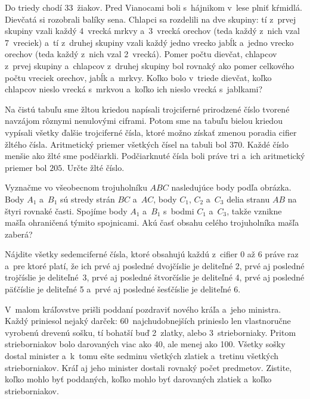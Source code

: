 {%
Do triedy chodí 33~žiakov. Pred Vianocami boli s~hájnikom v~lese plniť kŕmidlá. Dievčatá si rozobrali balíky sena. Chlapci sa rozdelili na dve skupiny: tí z~prvej skupiny vzali každý 4~vrecká mrkvy a~3~vrecká orechov (teda každý z~nich vzal 7~vreciek) a~tí z~druhej skupiny vzali každý jedno vrecko jabĺk a~jedno vrecko orechov (teda každý z~nich vzal 2~vrecká). Pomer počtu dievčat, chlapcov z~prvej skupiny a~chlapcov z~druhej skupiny bol rovnaký ako pomer celkového počtu vreciek orechov, jabĺk a~mrkvy. Koľko bolo v~triede dievčat, koľko chlapcov nieslo vrecká s~mrkvou a~koľko ich nieslo vrecká s~jablkami?}

{%
Na čistú tabuľu sme žltou kriedou napísali trojciferné prirodzené číslo tvorené navzájom rôznymi nenulovými ciframi. Potom sme na tabuľu bielou kriedou vypísali všetky ďalšie trojciferné čísla, ktoré možno získať zmenou poradia cifier žltého čísla. Aritmetický priemer všetkých čísel na tabuli bol $370$. Každé číslo menšie ako žlté sme podčiarkli. Podčiarknuté čísla boli práve tri a~ich aritmetický priemer bol $205$. Určte žlté číslo.}

{%
Vyznačme vo všeobecnom trojuholníku $ABC$ nasledujúce body podľa \ifobrazkyvedla{}obrázka\else\obr{}\fi{}. Body $A_1$ a~$B_1$ sú stredy strán $BC$ a~$AC$, body $C_1$, $C_2$ a~$C_3$ delia stranu $AB$ na štyri rovnaké časti. Spojíme body $A_1$ a~$B_1$ s~bodmi $C_1$ a~$C_3$, takže vznikne mašľa ohraničená týmito spojnicami. Akú časť obsahu celého trojuholníka mašľa zaberá?
\ifobrazkyvedla\else{}\fi%
}

{%
Nájdite všetky sedemciferné čísla, ktoré obsahujú každú z~cifier $0$ až $6$ práve raz a~pre ktoré platí, že ich prvé aj posledné dvojčíslie je deliteľné 2, prvé aj posledné trojčíslie je deliteľné~3, prvé aj posledné štvorčíslie je deliteľné 4, prvé aj posledné päťčíslie je deliteľné 5 a~prvé aj posledné šesťčíslie je deliteľné 6.}

{%
V~malom kráľovstve prišli poddaní pozdraviť nového kráľa a~jeho ministra.
Každý priniesol nejaký darček:
60~najchudobnejších prinieslo len vlastnoručne vyrobenú drevenú sošku,
tí bohatší buď 2~zlatky, alebo 3~strieborniaky.
Pritom strieborniakov bolo darovaných viac ako 40, ale menej ako 100.
Všetky sošky dostal minister a~k~tomu ešte sedminu všetkých zlatiek a~tretinu
všetkých strieborniakov.
Kráľ aj jeho minister dostali rovnaký počet predmetov.
Zistite, koľko mohlo byť poddaných, koľko mohlo byť darovaných zlatiek a~koľko strieborniakov.
}

